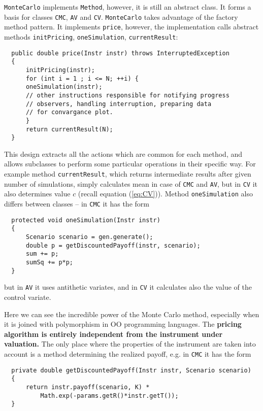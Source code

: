 \documentclass[a4paper,11pt, twoside]{book}
\theoremstyle{definition}
\theoremstyle{remark}
\begin{document}
\texttt{MonteCarlo} implements \texttt{Method}, however, it is still an abstract class. It forms a basis for classes \texttt{CMC}, \texttt{AV} and \texttt{CV}. \texttt{MonteCarlo} takes advantage of the factory method pattern. It implements \texttt{price}, however, the implementation calls abstract methods \texttt{initPricing}, \texttt{oneSimulation}, \texttt{currentResult}:

\begin{lstlisting}
  public double price(Instr instr) throws InterruptedException
  {
      initPricing(instr);
      for (int i = 1 ; i <= N; ++i) {
	  oneSimulation(instr);
	  // other instructions responsible for notifying progress
	  // observers, handling interruption, preparing data
	  // for convargance plot.
      }
      return currentResult(N);
  }
\end{lstlisting}
   
This design extracts all the actions which are common for each method, and allows subclasses to perform some particular operations in their specific way. For example method \texttt{currentResult}, which returns intermediate results after given number of simulations, simply calculates mean in case of \texttt{CMC} and \texttt{AV}, but in \texttt{CV} it also determines value $c$ (recall equation (\ref{eq:CV})). Method \texttt{oneSimulation} also differs between classes -- in \texttt{CMC} it has the form

\begin{lstlisting}
  protected void oneSimulation(Instr instr)
  {
      Scenario scenario = gen.generate();
      double p = getDiscountedPayoff(instr, scenario);
      sum += p;
      sumSq += p*p;
  }
\end{lstlisting}
   
but in \texttt{AV} it uses antithetic variates, and in \texttt{CV} it calculates also the value of the control variate.

Here we can see the incredible power of the Monte Carlo method, especially when it is joined with polymorphism in OO programming languages. The \textbf{pricing algorithm is entirely independent from the instrument under valuation.} The only place where the properties of the instrument are taken into account is a method determining the realized payoff, e.g. in \texttt{CMC} it has the form

\begin{lstlisting}
  private double getDiscountedPayoff(Instr instr, Scenario scenario)
  { 
      return instr.payoff(scenario, K) *
	      Math.exp(-params.getR()*instr.getT());
  }
\end{lstlisting}
\end{document}

